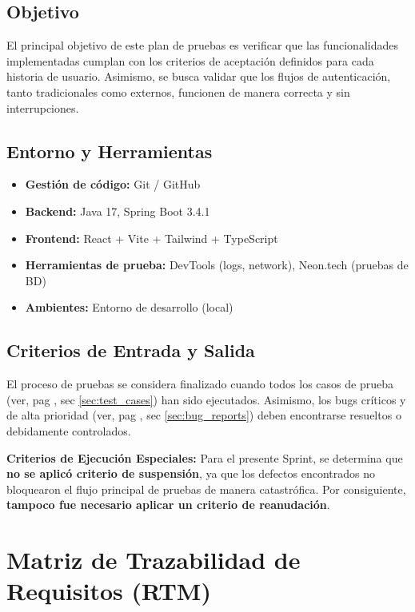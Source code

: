 \subsection{Objetivo}
El principal objetivo de este plan de pruebas es verificar que las funcionalidades implementadas cumplan con los criterios de aceptación definidos para cada historia de usuario. Asimismo, se busca validar que los flujos de autenticación, tanto tradicionales como externos, funcionen de manera correcta y sin interrupciones.

\subsection{Entorno y Herramientas}
\begin{itemize}[noitemsep]
    \item \textbf{Gestión de código:} Git / GitHub
    \item \textbf{Backend:} Java 17, Spring Boot 3.4.1
    \item \textbf{Frontend:} React + Vite + Tailwind + TypeScript
    \item \textbf{Herramientas de prueba:} DevTools (logs, network), Neon.tech (pruebas de BD)
    \item \textbf{Ambientes:} Entorno de desarrollo (local)
\end{itemize}

\subsection{Criterios de Entrada y Salida}
El proceso de pruebas se considera finalizado cuando todos los casos de prueba (ver, pag \pageref{sec:test_cases}, sec \ref{sec:test_cases}) han sido ejecutados. Asimismo, los bugs críticos y de alta prioridad (ver, pag \pageref{sec:bug_reports}, sec \ref{sec:bug_reports}) deben encontrarse resueltos o debidamente controlados. 

\textbf{Criterios de Ejecución Especiales:} Para el presente Sprint, se determina que \textbf{no se aplicó criterio de suspensión}, ya que los defectos encontrados no bloquearon el flujo principal de pruebas de manera catastrófica. Por consiguiente, \textbf{tampoco fue necesario aplicar un criterio de reanudación}.

\section{Matriz de Trazabilidad de Requisitos (RTM)}
\label{sec:rtm}

